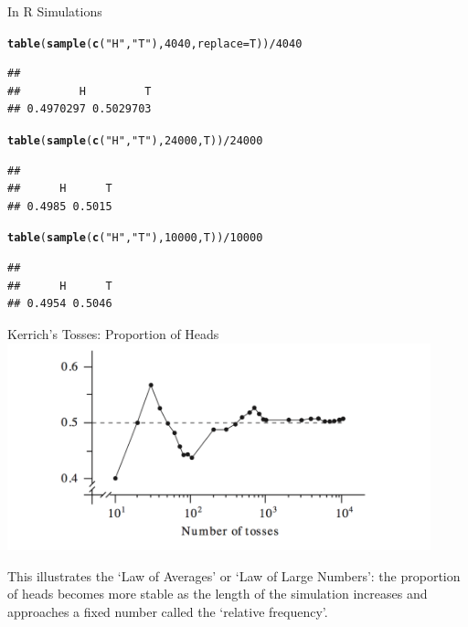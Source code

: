 \documentclass[t,xcolor=pdftex,dvipsnames,table]{beamer}\usepackage[]{graphicx}\usepackage[]{color}
\makeatletter
\newcommand{\hlnum}[1]{\textcolor[rgb]{0.686,0.059,0.569}{#1}}%
\newcommand{\hlstr}[1]{\textcolor[rgb]{0.192,0.494,0.8}{#1}}%
\newcommand{\hlopt}[1]{\textcolor[rgb]{0,0,0}{#1}}%
\newcommand{\hlstd}[1]{\textcolor[rgb]{0.345,0.345,0.345}{#1}}%
\newcommand{\hlkwc}[1]{\textcolor[rgb]{0.333,0.667,0.333}{#1}}%
\newcommand{\hlkwd}[1]{\textcolor[rgb]{0.737,0.353,0.396}{\textbf{#1}}}%
\newenvironment{kframe}{%
 \def\at@end@of@kframe{}%
 \ifinner\ifhmode%
  \def\at@end@of@kframe{\end{minipage}}%
  \begin{minipage}{\columnwidth}%
 \fi\fi%
 \def\FrameCommand##1{\hskip\@totalleftmargin \hskip-\fboxsep
 \colorbox{shadecolor}{##1}\hskip-\fboxsep
     \hskip-\linewidth \hskip-\@totalleftmargin \hskip\columnwidth}%
 \MakeFramed {\advance\hsize-\width
   \@totalleftmargin\z@ \linewidth\hsize
   \@setminipage}}%
 {\par\unskip\endMakeFramed%
 \at@end@of@kframe}
\newenvironment{knitrout}{}{} %
\makeatother
\begin{document}
\begin{frame}[fragile]{}

In R Simulations

\begin{knitrout}
\color{fgcolor}\begin{kframe}
\begin{alltt}
\hlkwd{table}\hlstd{(}\hlkwd{sample}\hlstd{(}\hlkwd{c}\hlstd{(}\hlstr{"H"}\hlstd{,}\hlstr{"T"}\hlstd{),}\hlnum{4040}\hlstd{,}\hlkwc{replace}\hlstd{=T))}\hlopt{/}\hlnum{4040}
\end{alltt}
\begin{verbatim}
## 
##         H         T 
## 0.4970297 0.5029703
\end{verbatim}
\begin{alltt}
\hlkwd{table}\hlstd{(}\hlkwd{sample}\hlstd{(}\hlkwd{c}\hlstd{(}\hlstr{"H"}\hlstd{,}\hlstr{"T"}\hlstd{),}\hlnum{24000}\hlstd{,T))}\hlopt{/}\hlnum{24000}
\end{alltt}
\begin{verbatim}
## 
##      H      T 
## 0.4985 0.5015
\end{verbatim}
\begin{alltt}
\hlkwd{table}\hlstd{(}\hlkwd{sample}\hlstd{(}\hlkwd{c}\hlstd{(}\hlstr{"H"}\hlstd{,}\hlstr{"T"}\hlstd{),}\hlnum{10000}\hlstd{,T))}\hlopt{/}\hlnum{10000}
\end{alltt}
\begin{verbatim}
## 
##      H      T 
## 0.4954 0.5046
\end{verbatim}
\end{kframe}
\end{knitrout}

\end{frame}

\begin{frame}{}
Kerrich's Tosses: Proportion of Heads
\includegraphics[height=6cm]{../images/KerrichTosses.jpg}

This illustrates the `Law of Averages' or `Law of Large Numbers': the proportion of heads becomes more stable as the length of the simulation increases and approaches a fixed number called the `relative frequency'.

\end{frame}
\end{document}

